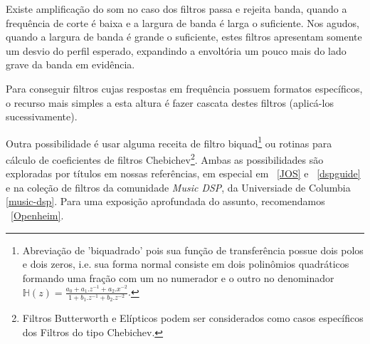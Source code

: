 \begin{itemize}
Existe amplificação do som no caso dos filtros passa e rejeita banda, quando a frequência
de corte é baixa e a largura de banda é larga o suficiente. Nos agudos, quando a largura
de banda é grande o suficiente, estes filtros apresentam
somente um desvio do perfil esperado, expandindo a envoltória um pouco mais do lado grave da banda em
evidência.

Para conseguir filtros cujas respostas em frequência possuem formatos específicos,
o recurso mais simples a esta altura
é fazer cascata destes filtros (aplicá-los sucessivamente).

Outra possibilidade é usar alguma receita de filtro
biquad\footnote{Abreviação
de 'biquadrado' pois sua função de transferência possue dois polos e dois zeros, i.e. sua
forma normal consiste em dois polinômios quadráticos formando uma fração com um no numerador e o outro no denominador
$\mathbb{H}(z)=\frac{a_0+a_1.z^{-1}+a_2.x^{-2}}{1+ b_1.z^{-1} +b_2 . z^{-2}}$.}
ou rotinas para cálculo de coeficientes
de filtros Chebichev\footnote{Filtros Butterworth e Elípticos podem
ser considerados como casos específicos dos Filtros do tipo Chebichev.}.
Ambas as possibilidades são exploradas
por títulos em nossas referências, em especial em ~\ref{JOS} e ~\ref{dspguide} e na coleção de filtros da comunidade \emph{Music DSP}, da Universiade de Columbia \ref{music-dsp}.
Para uma exposição aprofundada do assunto, recomendamos ~\ref{Openheim}.

\end{itemize}

